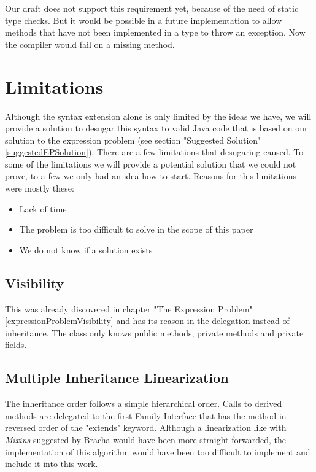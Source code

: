 \documentclass{report}
\begin{document}
Our draft does not support this requirement yet, because of the need of static type checks. But it would be possible in a future implementation to allow methods that have not been implemented in a type to throw an exception. Now the compiler would fail on a missing method.

\section{Limitations}
\label{syntaxExtensionLimitations}

Although the syntax extension alone is only limited by the ideas we have, we will provide a solution to desugar this syntax to valid Java code that is based on our solution to the expression problem (see section "Suggested Solution" \ref{suggestedEPSolution}). There are a few limitations that desugaring caused. To some of the limitations we will provide a potential solution that we could not prove, to a few we only had an idea how to start. Reasons for this limitations were mostly these:
\begin{itemize}
  \item Lack of time
  \item The problem is too difficult to solve in the scope of this paper
  \item We do not know if a solution exists
\end{itemize}

\subsection{Visibility}

This was already discovered in chapter "The Expression Problem" \ref{expressionProblemVisibility} and has its reason in the delegation instead of inheritance.
The class only knows public methods, private methods and private fields.

\subsection{Multiple Inheritance Linearization}

The inheritance order follows a simple hierarchical order. Calls to derived methods are delegated to the first Family Interface that has the method in reversed order of the "extends" keyword. Although a linearization like with \emph{Mixins} suggested by Bracha \cite{Bracha-Mixin-1990} would have been more straight-forwarded, the implementation of this algorithm would have been too difficult to implement and include it into this work.
\end{document}

